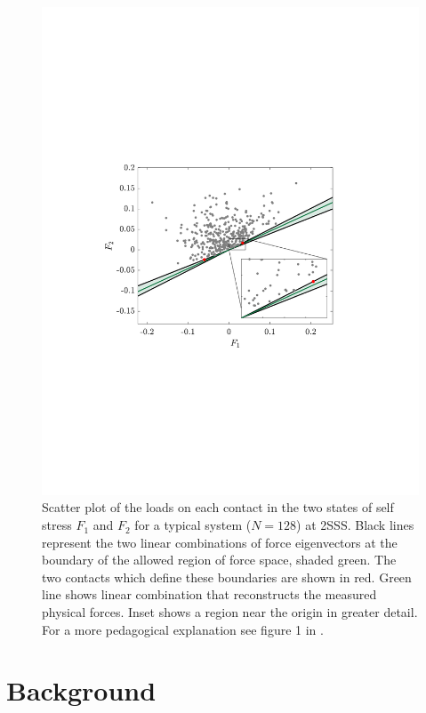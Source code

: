 \begin{figure}[t]
\includegraphics[width=\columnwidth, trim=99 240 136 255, clip]{contactBreakingPaper/forceSpace.pdf}
\caption{Scatter plot of the loads on each contact in the two states of self stress $F_1$ and $F_2$ for a typical system ($N=128$) at 2SSS. Black lines represent the two linear combinations of force eigenvectors at the boundary of the allowed region of force space, shaded green. The two contacts which define these boundaries are shown in red. Green line shows linear combination that reconstructs the measured physical forces. Inset shows a region near the origin in greater detail. For a more pedagogical explanation see figure 1 in \cite{sartor_direct_2020}.}
\label{plot:fig1}
\end{figure}


\section{Background}

